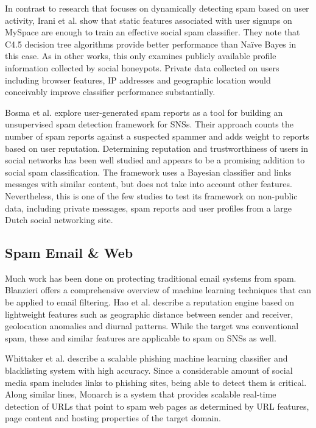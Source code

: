 \documentclass[preprint]{acm_proc_article-sp}
\begin{document}
In contrast to research that focuses on dynamically detecting spam based on user 
activity, Irani et al. \cite{irani} show that static features associated with user signups 
on MySpace are enough to train an effective social spam classifier. They note that
C4.5 decision tree algorithms provide better performance than Na\"ive Bayes in this case. 
As in other works, this only examines publicly available profile information collected 
by social honeypots. Private data collected on users including browser features, IP addresses 
and geographic location would conceivably improve classifier performance substantially.

Bosma et al. \cite{bosma} explore user-generated spam reports as a tool for building an unsupervised 
spam detection framework for SNSs. Their approach counts the number of spam reports against a 
suspected spammer and adds weight to reports based on user reputation. Determining reputation 
and trustworthiness of users in social networks has been well studied \cite{bian, guha, zhang} 
and appears to be a promising addition to social spam classification. The framework uses a 
Bayesian classifier and links messages with similar content, but does not take into account 
other features. Nevertheless, this is one of the few studies to test its framework on 
non-public data, including private messages, spam reports and user profiles from a 
large Dutch social networking site.

\subsection{Spam Email \& Web}

Much work has been done on protecting traditional email systems from spam. 
Blanzieri \cite{blanzieri} offers a comprehensive overview of machine learning techniques 
that can be applied to email filtering. Hao et al. \cite{hao} describe a reputation 
engine based on lightweight features such as geographic distance between sender and 
receiver, geolocation anomalies and diurnal patterns. While the target was conventional 
spam, these and similar features are applicable to spam on SNSs as well.

Whittaker et al. \cite{whittaker} describe a scalable phishing machine learning 
classifier and blacklisting system with high accuracy. Since a considerable 
amount of social media spam includes links to phishing sites, being able to 
detect them is critical. Along similar lines, Monarch \cite{thomas} is a 
system that provides scalable real-time detection of URLs that point to spam web pages as 
determined by URL features, page content and hosting properties of the target domain.
\end{document}
